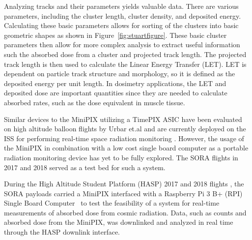Analyzing tracks and their parameters yields valuable data.  There are various parameters, including the cluster length, cluster density, and deposited energy.  Calculating these basic parameters allows for sorting of the clusters into basic geometric shapes as shown in Figure~\ref{fig:stuartfigure}.  These basic cluster parameters then allow for more complex analysis to extract useful information such the absorbed dose from a cluster and projected track length.  The projected track length is then used to calculate the Linear Energy Transfer (LET).  LET is dependent on particle track structure and morphology, so it is defined as the deposited energy per unit length.  In dosimetry applications, the LET and deposited dose are important quantities since they are needed to calculate absorbed rates, such as the dose equivalent in muscle tissue.

Similar devices to the MiniPIX utilizing a TimePIX ASIC have been evaluated on high altitude balloon flights by Urbar et.al \cite{bexus} and are currently deployed on the ISS for performing real-time space radiation monitoring \cite{timepixiss}. However, the usage of the MiniPIX in combination with a low cost single board computer as a portable radiation monitoring device has yet to be fully explored. The SORA flights in 2017 and 2018 served as a test bed for such a system.

%

During the High Altitude Student Platform (HASP) 2017 and 2018 flights \cite{hasp}, the SORA payloads carried a MiniPIX interfaced with a Raspberry Pi 3 B+ (RPI) Single Board Computer~\cite{rpi} to test the feasibility of a system for real-time measurements of absorbed dose from cosmic radiation. Data, such as counts and absorbed dose from the MiniPIX, was downlinked and analyzed in real time through the HASP downlink interface. 

